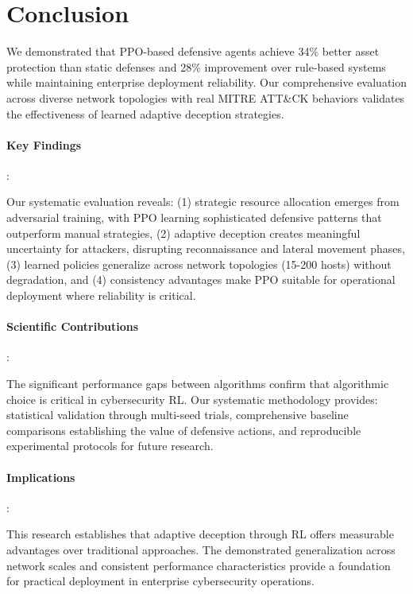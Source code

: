 \documentclass[12pt,oneside]{article}
\begin{document}
\clearpage
\section{Conclusion}

We demonstrated that PPO-based defensive agents achieve 34\% better asset protection than static defenses and 28\% improvement over rule-based systems while maintaining enterprise deployment reliability. Our comprehensive evaluation across diverse network topologies with real MITRE ATT\&CK behaviors validates the effectiveness of learned adaptive deception strategies.

\paragraph{Key Findings}:

Our systematic evaluation reveals: (1) strategic resource allocation emerges from adversarial training, with PPO learning sophisticated defensive patterns that outperform manual strategies, (2) adaptive deception creates meaningful uncertainty for attackers, disrupting reconnaissance and lateral movement phases, (3) learned policies generalize across network topologies (15-200 hosts) without degradation, and (4) consistency advantages make PPO suitable for operational deployment where reliability is critical.

\paragraph{Scientific Contributions}:

The significant performance gaps between algorithms confirm that algorithmic choice is critical in cybersecurity RL. Our systematic methodology provides: statistical validation through multi-seed trials, comprehensive baseline comparisons establishing the value of defensive actions, and reproducible experimental protocols for future research.

\paragraph{Implications}:

This research establishes that adaptive deception through RL offers measurable advantages over traditional approaches. The demonstrated generalization across network scales and consistent performance characteristics provide a foundation for practical deployment in enterprise cybersecurity operations.
\end{document}
